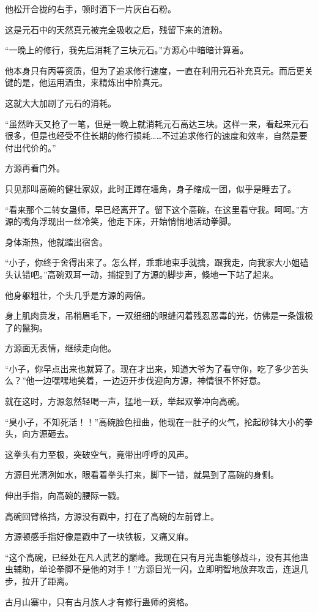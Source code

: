 \begin{this_body}
他松开合拢的右手，顿时洒下一片灰白石粉。

这是元石中的天然真元被完全吸收之后，残留下来的渣粉。

“一晚上的修行，我先后消耗了三块元石。”方源心中暗暗计算着。

他本身只有丙等资质，但为了追求修行速度，一直在利用元石补充真元。而后更关键的是，他运用酒虫，来精炼出中阶真元。

这就大大加剧了元石的消耗。

“虽然昨天又抢了一笔，但是一晚上就消耗元石高达三块。这样一来，看起来元石很多，但是也经受不住长期的修行损耗……不过追求修行的速度和效率，自然是要付出代价的。”

方源再看门外。

只见那叫高碗的健壮家奴，此时正蹲在墙角，身子缩成一团，似乎是睡去了。

“看来那个二转女蛊师，早已经离开了。留下这个高碗，在这里看守我。呵呵。”方源的嘴角浮现出一丝冷笑，他走下床，开始悄悄地活动拳脚。

身体渐热，他就踏出宿舍。

“小子，你终于舍得出来了。怎么样，乖乖地束手就擒，跟我走，向我家大小姐磕头认错吧。”高碗双耳一动，捕捉到了方源的脚步声，倏地一下站了起来。

他身躯粗壮，个头几乎是方源的两倍。

身上肌肉贲发，吊梢眉毛下，一双细细的眼缝闪着残忍恶毒的光，仿佛是一条饿极了的鬣狗。

方源面无表情，继续走向他。

“小子，你早点出来也就算了。现在才出来，知道大爷为了看守你，吃了多少苦头么？”他一边嘿嘿地笑着，一边迈开步伐迎向方源，神情很不怀好意。

就在这时，方源忽然轻喝一声，猛地一跃，举起双拳冲向高碗。

“臭小子，不知死活！！”高碗脸色扭曲，他现在一肚子的火气，抡起砂钵大小的拳头，向方源砸去。

这拳头有力至极，突破空气，竟带出呼呼的风声。

方源目光清冽如水，眼看着拳头打来，脚下一错，就晃到了高碗的身侧。

伸出手指，向高碗的腰际一戳。

高碗回臂格挡，方源没有戳中，打在了高碗的左前臂上。

方源顿感手指好像是戳中了一块铁板，又痛又麻。

“这个高碗，已经处在凡人武艺的巅峰。我现在只有月光蛊能够战斗，没有其他蛊虫辅助，单论拳脚不是他的对手！”方源目光一闪，立即明智地放弃攻击，连退几步，拉开了距离。

古月山寨中，只有古月族人才有修行蛊师的资格。


\end{this_body}
